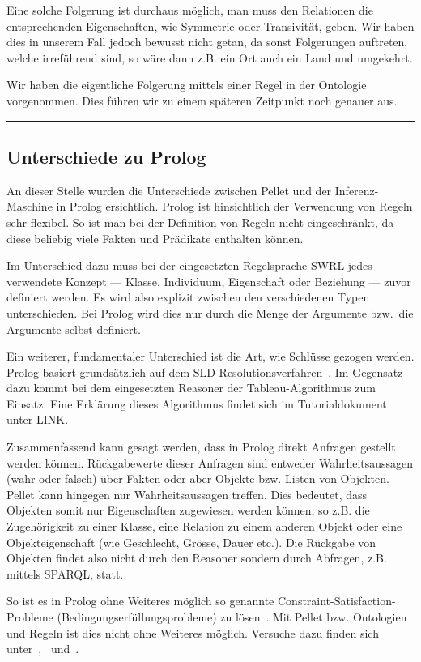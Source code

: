 Eine solche Folgerung ist durchaus möglich, man muss den Relationen die entsprechenden Eigenschaften, wie Symmetrie oder Transivität, geben. Wir haben dies in unserem Fall jedoch bewusst nicht getan, da sonst Folgerungen auftreten, welche irreführend sind, so wäre dann z.B. ein Ort auch ein Land und umgekehrt.

Wir haben die eigentliche Folgerung mittels einer Regel in der Ontologie vorgenommen. Dies führen wir zu einem späteren Zeitpunkt noch genauer aus.

\noindent\rule[1ex]{\textwidth}{1pt}

\subsection{Unterschiede zu Prolog}
\label{}
An dieser Stelle wurden die Unterschiede zwischen Pellet und der Inferenz-Maschine in Prolog ersichtlich. Prolog ist hinsichtlich der Verwendung von Regeln sehr flexibel. So ist man bei der Definition von Regeln nicht eingeschränkt, da diese beliebig viele Fakten und Prädikate enthalten können.

Im Unterschied dazu muss bei der eingesetzten Regelsprache SWRL jedes verwendete Konzept --- Klasse, Individuum, Eigenschaft oder Beziehung --- zuvor definiert werden. Es wird also explizit zwischen den verschiedenen Typen unterschieden. Bei Prolog wird dies nur durch die Menge der Argumente bzw.\ die Argumente selbst definiert.

Ein weiterer, fundamentaler Unterschied ist die Art, wie Schlüsse gezogen werden. Prolog basiert grundsätzlich auf dem SLD-Resolutionsverfahren~\citep[Details siehe][Seite 68]{laemmel}. Im Gegensatz dazu kommt bei dem eingesetzten Reasoner der Tableau-Algorithmus zum Einsatz. Eine Erklärung dieses Algorithmus findet sich im Tutorialdokument unter LINK.

Zusammenfassend kann gesagt werden, dass in Prolog direkt Anfragen gestellt werden können. Rückgabewerte dieser Anfragen sind entweder Wahrheitsaussagen (wahr oder falsch) über Fakten oder aber Objekte bzw. Listen von Objekten. Pellet kann hingegen nur Wahrheitsaussagen treffen. Dies bedeutet, dass Objekten somit nur Eigenschaften zugewiesen werden können, so z.B. die Zugehörigkeit zu einer Klasse, eine Relation zu einem anderen Objekt oder eine Objekteigenschaft (wie Geschlecht, Grösse, Dauer etc.). Die Rückgabe von Objekten findet also nicht durch den Reasoner sondern durch Abfragen, z.B. mittels SPARQL, statt.

So ist es in Prolog ohne Weiteres möglich so genannte Constraint-Satisfaction-Probleme (Bedingungserfüllungsprobleme) zu lösen~\citep[Details siehe][Seite 148]{laemmel}. Mit Pellet bzw. Ontologien und Regeln ist dies nicht ohne Weiteres möglich. Versuche dazu finden sich unter~\citet{xiong2008constraint},~\citet{staab2006constraint} und~\citet{bramer2007constraint}.
